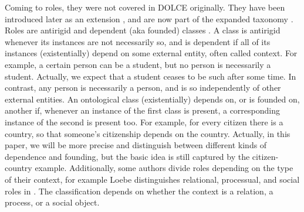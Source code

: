 \documentclass[sw]{iosart2x}
\newcommand{\DOLCE}{\textsc{DOLCE}\xspace} %
\begin{document}
Coming to roles, they were not covered in \DOLCE originally. They have been introduced later as an extension \cite{masoloSocialRolesTheir2004}, and are now part of the expanded taxonomy \cite{borgoDOLCEDescriptiveOntology2022}.
Roles are antirigid and dependent (aka founded) classes \cite{guarinoOverviewOntoClean2009, guarinoFormalOntologyProperties2000,masoloSocialRolesTheir2004}. 
A class is antirigid whenever its instances are not necessarily so, and is dependent if all of its instances (existentially) depend on some external entity, often called context.
For example, a certain person can be a student, but no person is necessarily a student. Actually, we expect that a student ceases to be such after some time. 
In contrast, any person is necessarily a person, and is so independently of other external entities.
An ontological class (existentially) depends on, or is founded on, another if, whenever an instance of the first class is present, a corresponding instance of the second is present too.
For example, for every citizen there is a country, so that someone's citizenship depends on the country. Actually, in this paper, we will be more precise and distinguish between different kinds of dependence and founding, but the basic idea is still captured by the citizen-country example. 
Additionally, some authors divide roles depending on the type of their context, 
for example Loebe distinguishes relational, processual, and social roles in \cite{loebeAbstractVsSocial2007}. The classification depends on whether the context is a relation, a process, or a social object. 
\end{document}
